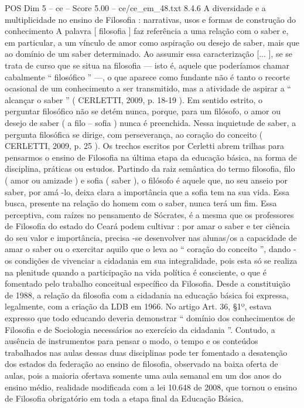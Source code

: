 \begin{textsample}{POS Dim 5 – ce – Score 5.00 – ce/ce\_em\_48.txt}  \label{ex:f5_pos_254}
8.4.6 A diversidade e a multiplicidade no ensino de Filosofia : narrativas, usos e formas de construção do conhecimento A palavra [ filosofia ] faz referência a uma relação com o saber e, em particular, a um vínculo de amor como aspiração ou desejo de saber, mais que ao domínio de um saber determinado.
Ao assumir essa caracterização [... ], se se trata de curso que se situa na filosofia — isto é, aquele que poderíamos chamar cabalmente “ filosófico ” —, o que aparece como fundante não é tanto o recorte ocasional de um conhecimento a ser transmitido, mas a atividade de aspirar a “ alcançar o saber ” ( CERLETTI, 2009, p. 18-19 ).
Em sentido estrito, o perguntar filosófico não se detém nunca, porque, para um filósofo, o amor ou desejo de saber ( a filo – sofia ) nunca é preenchida.
Nessa inquietude de saber, a pergunta filosófica se dirige, com perseverança, ao coração do conceito ( CERLETTI, 2009, p. 25 ).
Os trechos escritos por Cerletti abrem trilhas para pensarmos o ensino de Filosofia na última etapa da educação básica, na forma de disciplina, práticas ou estudos.
Partindo da raiz semântica do termo filosofia, filo ( amor ou amizade ) e sofia ( saber ), o filósofo é aquele que, no seu anseio por saber, por amá -lo, deixa clara a importância que a sofia tem na sua vida.
Essa busca, presente na relação do homem com o saber, nunca terá um fim.
Essa perceptiva, com raízes no pensamento de Sócrates, é a mesma que os professores de Filosofia do estado do Ceará podem cultivar : por amar o saber e ter ciência do seu valor e importância, precisa -se desenvolver nas alunas/os a capacidade de amar o saber ou o exercitar aquilo que o leva ao “ coração do conceito ”, dando -os condições de vivenciar a cidadania em sua integralidade, pois esta só se realiza na plenitude quando a participação na vida política é consciente, o que é fomentado pelo trabalho conceitual específico da Filosofia.
Desde a constituição de 1988, a relação da filosofia com a cidadania na educação básica foi expressa, legalmente, com a criação da LDB em 1966.
No artigo Art. 36, §1º, estava expresso que todo educando deveria demonstrar “ domínio dos conhecimentos de Filosofia e de Sociologia necessários ao exercício da cidadania ”.
Contudo, a ausência de instrumentos para pensar o modo, o tempo e os conteúdos trabalhados nas aulas dessas duas disciplinas pode ter fomentado a desatenção dos estados da federação ao ensino de filosofia, observado na baixa oferta de aulas, pois a maioria ofertava somente uma aula semanal em um dos anos do ensino médio, realidade modificada com a lei 10.648 de 2008, que tornou o ensino de Filosofia obrigatório em toda a etapa final da Educação Básica.

\end{textsample}
